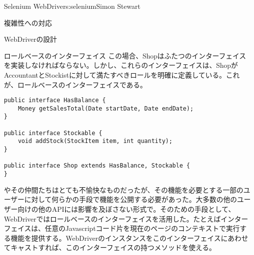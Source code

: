 \begin{aosachapter}{Selenium WebDriver}{s:selenium}{Simon Stewart}
\begin{aosasect1}{複雑性への対応}
\begin{aosasect2}{WebDriverの設計}
\begin{aosabox}{ロールベースのインターフェイス}
この場合、Shopはふたつのインターフェイスを実装しなければならない。しかし、これらのインターフェイスは、ShopがAccountantとStockistに対して満たすべきロールを明確に定義している。これが、ロールベースのインターフェイスである。

\begin{verbatim}
public interface HasBalance {
    Money getSalesTotal(Date startDate, Date endDate);
}

public interface Stockable {
    void addStock(StockItem item, int quantity);
}

public interface Shop extends HasBalance, Stockable {
}
\end{verbatim}
\end{aosabox}

やその仲間たちはとても不愉快なものだったが、その機能を必要とする一部のユーザーに対して何らかの手段で機能を公開する必要があった。大多数の他のユーザー向けの他のAPIには影響を及ぼさない形式で。そのための手段として、WebDriverではロールベースのインターフェイスを活用した。たとえばインターフェイスは、任意のJavascriptコード片を現在のページのコンテキストで実行する機能を提供する。WebDriverのインスタンスをこのインターフェイスにあわせてキャストすれば、このインターフェイスの持つメソッドを使える。




\end{aosasect2}
\end{aosasect1}
\end{aosachapter}
